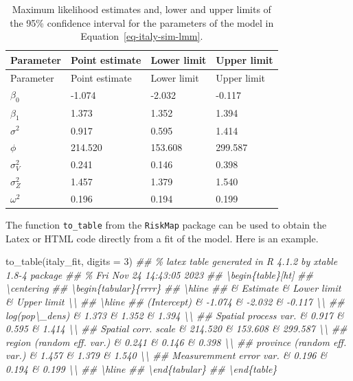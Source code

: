 \documentclass[
  letterpaper,
]{krantz}
\newenvironment{Shaded}{\begin{snugshade}}{\end{snugshade}}
\newcommand{\AttributeTok}[1]{\textcolor[rgb]{0.40,0.45,0.13}{#1}}
\newcommand{\DecValTok}[1]{\textcolor[rgb]{0.68,0.00,0.00}{#1}}
\newcommand{\DocumentationTok}[1]{\textcolor[rgb]{0.37,0.37,0.37}{\textit{#1}}}
\newcommand{\FunctionTok}[1]{\textcolor[rgb]{0.28,0.35,0.67}{#1}}
\newcommand{\NormalTok}[1]{\textcolor[rgb]{0.00,0.23,0.31}{#1}}
\begin{document}
\hypertarget{tbl-italy-sim-mle}{}
\begin{longtable}[]{@{}llll@{}}
\caption{\label{tbl-italy-sim-mle}Maximum likelihood estimates and,
lower and upper limits of the 95\% confidence interval for the
parameters of the model in
Equation~\ref{eq-italy-sim-lmm}.}\tabularnewline
\toprule\noalign{}
Parameter & Point estimate & Lower limit & Upper limit \\
\midrule\noalign{}
\endfirsthead
\toprule\noalign{}
Parameter & Point estimate & Lower limit & Upper limit \\
\midrule\noalign{}
\endhead
\bottomrule\noalign{}
\endlastfoot
\(\beta_0\) & -1.074 & -2.032 & -0.117 \\
\(\beta_1\) & 1.373 & 1.352 & 1.394 \\
\(\sigma^2\) & 0.917 & 0.595 & 1.414 \\
\(\phi\) & 214.520 & 153.608 & 299.587 \\
\(\sigma^2_{V}\) & 0.241 & 0.146 & 0.398 \\
\(\sigma^2_{Z}\) & 1.457 & 1.379 & 1.540 \\
\(\omega^2\) & 0.196 & 0.194 & 0.199 \\
\end{longtable}

The function \texttt{to\_table} from the \texttt{RiskMap} package can be
used to obtain the Latex or HTML code directly from a fit of the model.
Here is an example.

\begin{Shaded}
\begin{Highlighting}[]
\FunctionTok{to\_table}\NormalTok{(italy\_fit, }\AttributeTok{digits =} \DecValTok{3}\NormalTok{)}
\DocumentationTok{\#\# \% latex table generated in R 4.1.2 by xtable 1.8{-}4 package}
\DocumentationTok{\#\# \% Fri Nov 24 14:43:05 2023}
\DocumentationTok{\#\# \textbackslash{}begin\{table\}[ht]}
\DocumentationTok{\#\# \textbackslash{}centering}
\DocumentationTok{\#\# \textbackslash{}begin\{tabular\}\{rrrr\}}
\DocumentationTok{\#\#   \textbackslash{}hline}
\DocumentationTok{\#\#  \& Estimate \& Lower limit \& Upper limit \textbackslash{}\textbackslash{} }
\DocumentationTok{\#\#   \textbackslash{}hline}
\DocumentationTok{\#\# (Intercept) \& {-}1.074 \& {-}2.032 \& {-}0.117 \textbackslash{}\textbackslash{} }
\DocumentationTok{\#\#   log(pop\textbackslash{}\_dens) \& 1.373 \& 1.352 \& 1.394 \textbackslash{}\textbackslash{} }
\DocumentationTok{\#\#   Spatial process var. \& 0.917 \& 0.595 \& 1.414 \textbackslash{}\textbackslash{} }
\DocumentationTok{\#\#   Spatial corr. scale \& 214.520 \& 153.608 \& 299.587 \textbackslash{}\textbackslash{} }
\DocumentationTok{\#\#   region (random eff. var.) \& 0.241 \& 0.146 \& 0.398 \textbackslash{}\textbackslash{} }
\DocumentationTok{\#\#   province (random eff. var.) \& 1.457 \& 1.379 \& 1.540 \textbackslash{}\textbackslash{} }
\DocumentationTok{\#\#   Measuremment error var. \& 0.196 \& 0.194 \& 0.199 \textbackslash{}\textbackslash{} }
\DocumentationTok{\#\#    \textbackslash{}hline}
\DocumentationTok{\#\# \textbackslash{}end\{tabular\}}
\DocumentationTok{\#\# \textbackslash{}end\{table\}}
\end{Highlighting}
\end{Shaded}
\end{document}
